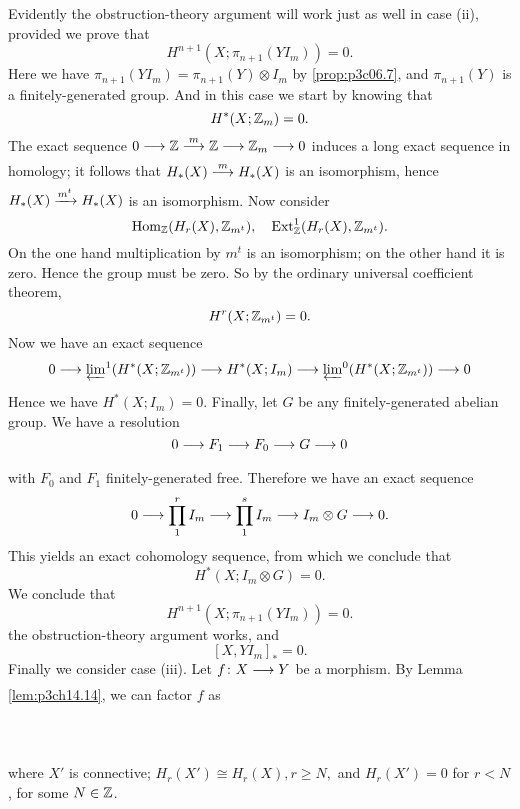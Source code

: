 \documentclass[../main]{subfiles}
\begin{document}
Evidently the obstruction-theory argument will work just as well in case (ii), provided we prove that 
\[
H^{n+1}(X;\pi_{n+1}(YI_{m}))=0
.\]
Here we have $\pi_{n+1}(YI_{m})=\pi_{n+1}(Y)\otimes I_{m}$ by \ref{prop:p3c06.7}, and $\pi_{n+1}(Y)$ is a finitely-generated group. And in this case we start by knowing that 
\[
  H^\ast(X;\mathbb{Z}_{m})=0.
\] 
The exact sequence $0 \lar{} \bZ \vra{m} \bZ \lar{} \bZ_{m} \lar{} 0 $ induces a long exact sequence in homology; it follows that $H_{\ast}(X) \vra{m} H_{\ast}(X) $ is an isomorphism, hence $H_{\ast}(X) \vra{m^t}  H_{\ast}(X)$ is an isomorphism. Now consider 
\[
\mathrm{Hom}_{\mathbb{Z}} (H_{r}(X), \mathbb{Z}_{m^t}), \quad \mathrm{Ext}^1_{\mathbb{Z}}(H_{r}(X),\mathbb{Z}_{m^t}).
\] 
On the one hand multiplication by $m^t$ is an isomorphism; on the other hand it is zero. Hence the group must be zero. So by the ordinary universal coefficient theorem, 
 \[
  H^r(X;\mathbb{Z}_{m^t}) = 0.
\] 
Now we have an exact sequence 
\[
  0 \lar{} \varprojlim\!^1 (H^\ast(X;\bZ_{m^t})) \lar{} H^\ast(X;I_{m}) \lar{} \varprojlim\!^0(H^\ast(X;\bZ_{m^t})) \lar{} 0
\] 
Hence we have $H^\ast(X;I_{m})=0$. Finally, let $G$ be any finitely-generated abelian group. We have a resolution
\[
  0 \lar{} F_1 \lar{} F_0 \lar{} G \lar{} 0
\] 
with $F_0$ and $F_1$ finitely-generated free. Therefore we have an exact sequence 
\[
  0 \lar{} \prod_{1}^{r} I_{m} \lar{} \prod_{1}^{s} I_{m} \lar{} I_{m} \otimes G \lar{} 0.  
\] 
This yields an exact cohomology sequence, from which we conclude that 
\[
  H^\ast(X;I_{m} \otimes G)=0.
\] 
We conclude that 
\[
H^{n+1}(X;\pi_{n+1}(YI_{m}))=0.
\] 
the obstruction-theory argument works, and 
\[
  \left[X,YI_{m}\right]_{\ast}=0.
\] 
Finally we consider case (iii). Let $f\colon  X \lar{}  Y $ be a morphism. By Lemma \ref{lem:p3ch14.14}, we can factor $f$ as 
~\\~\\
~\\~\\
where $X'$ is connective; $H_{r}(X') \cong H_{r}(X), r \ge N, $ and $H_{r}(X') =0$ for $r < N$, for some  $N \in \mathbb{Z}$.
\end{document}
